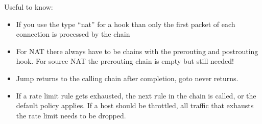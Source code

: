 \documentclass{report}
\begin{document}
Useful to know:

\begin{itemize}
\item
  If you use the type ``nat'' for a hook than only the first packet of
  each connection is processed by the chain
\item
  For NAT there always have to be chains with the prerouting and
  postrouting hook. For source NAT the prerouting chain is empty but
  still needed!
\item
  Jump returns to the calling chain after completion, goto never
  returns.
\item
  If a rate limit rule gets exhausted, the next rule in the chain is
  called, or the default policy applies. If a host should be throttled,
  all traffic that exhausts the rate limit needs to be dropped.

\end{itemize}
\end{document}
